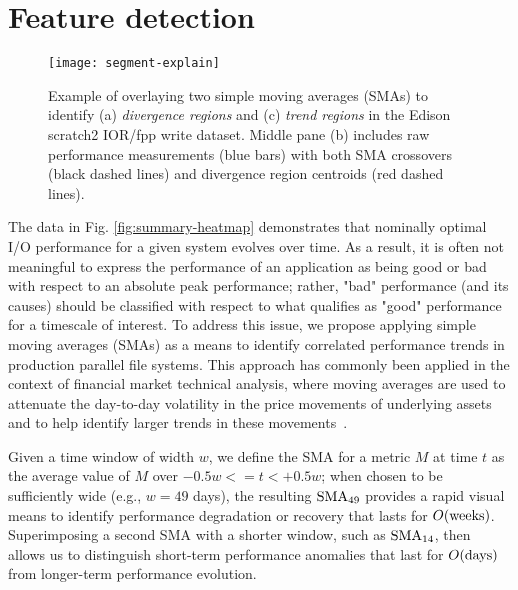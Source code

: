 \section{Feature detection}  \label{sec:features}

\begin{figure}[t]
    \centering
    \texttt{[image: segment-explain]}
    \vspace{-.35in}
    \caption{Example of overlaying two simple moving averages (SMAs) to identify (a) \emph{divergence regions} and (c) \emph{trend regions} in the Edison scratch2 IOR/fpp write dataset.  Middle pane (b) includes raw performance measurements (blue bars) with both SMA crossovers (black dashed lines) and divergence region centroids (red dashed lines).}
    \label{fig:segment-explain}
\end{figure}

The data in Fig. \ref{fig:summary-heatmap} demonstrates that nominally optimal I/O performance for a given system evolves over time.
As a result, it is often not meaningful to express the performance of an application as being good or bad with respect to an absolute peak performance;
rather, "bad" performance (and its causes) should be classified with respect to what qualifies as "good" performance for a timescale of interest.
To address this issue, we propose applying simple moving averages (SMAs) as a means to identify correlated performance trends in production parallel file systems.
This approach has commonly been applied in the context of financial market technical analysis, where moving averages are used to attenuate the day-to-day volatility in the price movements of underlying assets and to help identify larger trends in these movements~\cite{james1968monthly,gunasekarage2001profitability}.

Given a time window of width $w$, we define the SMA for a metric $M$ at time $t$ as the average value of $M$ over ${-0.5w <= t < +0.5w}$;
when chosen to be sufficiently wide (e.g., $w = 49$ days), the resulting $\textup{SMA}_{49}$ provides a rapid visual means to identify performance degradation or recovery that lasts for $O(\textup{weeks})$.  Superimposing a second SMA with a shorter window, such as $\textup{SMA}_{14}$, then allows us to distinguish short-term performance anomalies that last for $O(\textup{days})$ from longer-term performance evolution.

